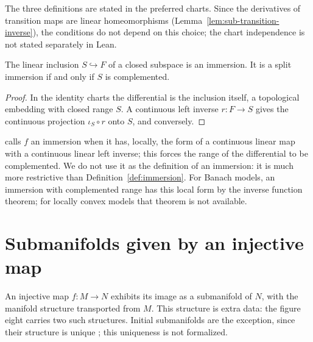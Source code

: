 \begin{remark}
  The three definitions are stated in the preferred charts. Since the derivatives of transition
  maps are linear homeomorphisms (Lemma~\ref{lem:sub-transition-inverse}), the conditions do not
  depend on this choice; the chart independence is not stated separately in Lean.
\end{remark}

\begin{proposition}
  \label{prop:sub-subtype-immersion}
  \leanok
  The linear inclusion $S \hookrightarrow F$ of a closed subspace is an immersion. It is a
  split immersion if and only if $S$ is complemented.
\end{proposition}

\begin{proof}
  \leanok
  In the identity charts the differential is the inclusion itself, a topological embedding with
  closed range $S$. A continuous left inverse $r \colon F \to S$ gives the continuous projection
  $\iota_S \circ r$ onto $S$, and conversely.
\end{proof}

\begin{remark}
  \label{rem:sub-gn-immersion}
  \cite[Def.~3.3.25(b)]{GN26} calls $f$ an immersion when it has, locally, the form of a
  continuous linear map with a continuous linear left inverse; this forces the range of the
  differential to be complemented. We do not use it as the definition of an immersion: it is
  much more restrictive than Definition~\ref{def:immersion}. For Banach models, an immersion with
  complemented range has this local form by the inverse function theorem; for locally convex
  models that theorem is not available.
\end{remark}

\section{Submanifolds given by an injective map}

An injective map $f \colon M \to N$ exhibits its image as a submanifold of $N$, with the
manifold structure transported from $M$. This structure is extra data: the figure eight carries
two such structures. Initial submanifolds are the exception, since their structure is unique
\cite[Lemma~3.3.24]{GN26}; this uniqueness is not formalized.

